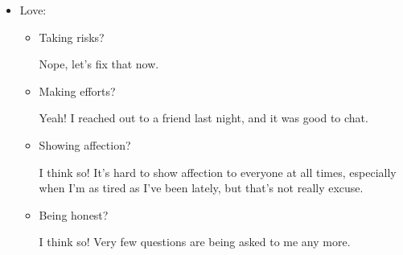 \documentclass[12pt]{article}
\renewcommand{\,}{\textsuperscript{,}}
\begin{document}
\begin{enumerate}
\begin{itemize}
\begin{itemize}
\begin{itemize}
\item Plots from the actual results of the runs, to make sure that it worked out.\footnote{SSC, AAT, if any vib states were good, what happened to the computations, etc}.

\end{itemize}

\begin{itemize}

\item Visual depiction of Grid Search

\item Visual depiction of random search

\item I guess that the stuff for intro to quantum video counts here.

\end{itemize}

Oof that's basically all things that I need to do this week. That's fun and exciting, I guess.

\item Organizing citations?

Not so much, no. I did go through and clean some citation data yesterday, because I think that I don't trust every computational result that comes out of scientists.\footnote{See \href{what-we-dont-post}{my post about that}}

\end{itemize}

\item Love:

\begin{itemize}

\item Taking risks?

Nope, let's fix that now.

\item Making efforts?

Yeah! I reached out to a friend last night, and it was good to chat.

\item Showing affection?

I think so! It's hard to show affection to everyone at all times, especially when I'm as tired as I've been lately, but that's not really excuse.

\item Being honest?

I think so! Very few questions are being asked to me any more.


\end{itemize}
\end{itemize}
\end{enumerate}
\end{document}
